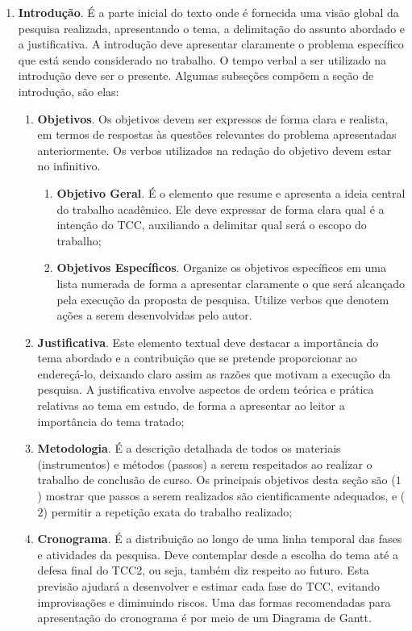 \begin{enumerate}[resume]
  \item \textbf{Introdução}. É a parte inicial do texto onde é fornecida uma visão global da pesquisa realizada, apresentando o tema, a delimitação do assunto abordado e a justificativa. A introdução deve apresentar claramente o problema específico que está sendo considerado no trabalho. O tempo verbal a ser utilizado na introdução deve ser o presente. Algumas subseções compõem a seção de introdução, são elas:
  \begin{enumerate}
    \item \textbf{Objetivos}. Os objetivos devem ser expressos de forma clara e realista, em termos de respostas às questões relevantes do problema apresentadas anteriormente. Os verbos utilizados na redação do objetivo devem estar no infinitivo.
    \begin{enumerate}
      \item \textbf{Objetivo Geral}. É o elemento que resume e apresenta a ideia central do trabalho acadêmico. Ele deve expressar de forma clara qual é a intenção do TCC, auxiliando a delimitar qual será o escopo do trabalho;
      \item \textbf{Objetivos Específicos}. Organize os objetivos específicos em uma lista numerada de forma a apresentar claramente o que será alcançado pela execução da proposta de pesquisa. Utilize verbos que denotem ações a serem desenvolvidas pelo autor.
    \end{enumerate}
    \item \textbf{Justificativa}. Este elemento textual deve destacar a importância do tema abordado e a contribuição que se pretende proporcionar ao endereçá-lo, deixando claro assim as razões que motivam a execução da pesquisa. A justificativa envolve aspectos de ordem teórica e prática relativas ao tema em estudo, de forma a apresentar ao leitor a importância do tema tratado;
    \item \textbf{Metodologia}. É a descrição detalhada de todos os materiais (instrumentos) e métodos (passos) a serem respeitados ao realizar o trabalho de conclusão de curso. Os principais objetivos desta seção são ($1$) mostrar que passos a serem realizados são cientificamente adequados, e ($2$) permitir a repetição exata do trabalho realizado;
    \item \textbf{Cronograma}. É a distribuição ao longo de uma linha temporal das fases e atividades da pesquisa. Deve contemplar desde a escolha do tema até a defesa final do TCC2, ou seja, também diz respeito ao futuro. Esta previsão ajudará a desenvolver e estimar cada fase do TCC, evitando improvisações e diminuindo riscos. Uma das formas recomendadas para apresentação do cronograma é por meio de um Diagrama de Gantt.

\end{enumerate}
\end{enumerate}
